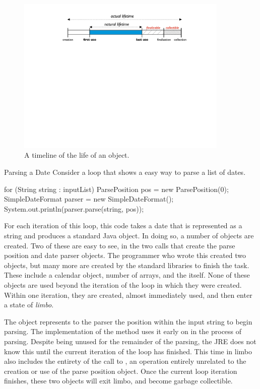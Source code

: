 \begin{figure}
	\includegraphics[width=0.9\textwidth]{Figures/object-lifecycle}
	\caption{A timeline of the life of an object.}
	\label{fig:typical-lifecycle}
\end{figure}

\begin{example}{Parsing a Date} Consider a loop that 
shows a easy way to parse a list of dates.
\begin{shortlisting}
	for (String string : inputList) {
		ParsePosition pos = new ParsePosition(0);
		SimpleDateFormat parser = new SimpleDateFormat();
		System.out.println(parser.parse(string, pos));
	}
\end{shortlisting}
For each iteration of this loop, this code takes a date that is represented as a
string and produces a standard Java  object. In doing so, a number of
objects are created. Two of these are easy to see, in the two  calls
that create the parse position and date parser objects. The programmer who wrote
this created two objects, but many more are created by the standard libraries to
finish the task. These include a calendar object, number of arrays, and the
 itself. None of these objects are used beyond the iteration of the
loop in which they were created. Within one iteration, they are created, almost
immediately used, and then enter a state of \emph{limbo}.


The  object represents to the parser the position within the
input string to begin parsing. The implementation of the  method
uses it early on in the process of parsing. Despite being unused for the
remainder of the parsing, the JRE does not know this until the current
iteration of the loop has finished. This time in limbo also includes the
entirety of the call to , an operation entirely
unrelated to the creation or use of the parse position object. Once the current
loop iteration finishes, these two objects will exit limbo, and become garbage
collectible.
\end{example}

